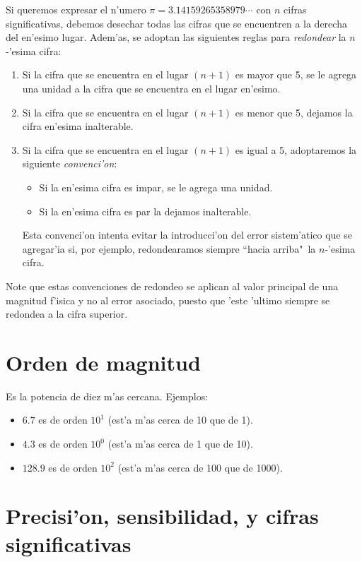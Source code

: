 \documentclass[a4paper]{report}
\begin{document}
Si queremos expresar el n'umero $\pi=3.14159265358979\cdots$ con $n$
cifras significativas, debemos desechar todas las cifras que se
encuentren a la derecha del en'esimo lugar. Adem'as, se adoptan las siguientes reglas para \emph{redondear} la $n$-'esima cifra:
\begin{enumerate}
\item Si la cifra que se encuentra en el lugar $(n + 1)$ es mayor que 5, se
  le agrega una unidad a la cifra que se encuentra en el lugar en'esimo.
\item Si la cifra que se encuentra en el lugar $(n + 1)$ es menor que 5,
  dejamos la cifra en'esima inalterable.
\item Si la cifra que se encuentra en el lugar $(n + 1)$ es igual a 5,
  adoptaremos la siguiente \textit{convenci'on}:
	\begin{itemize}
	\item Si la en'esima cifra es impar, se le agrega una unidad.
	\item Si la en'esima cifra es par la dejamos inalterable.
	\end{itemize}
Esta convenci'on intenta evitar la introducci'on del error sistem'atico que se agregar'ia si, por ejemplo, redondearamos siempre ``hacia arriba"\, la $n$-'esima cifra.
\end{enumerate}

Note que estas convenciones de redondeo se aplican al valor principal de una magnitud f'isica y no al error asociado, puesto que 'este 'ultimo siempre se redondea a la cifra superior.

\section{Orden de magnitud}
Es la potencia de diez m'as cercana. 
Ejemplos:
\begin{itemize}
\item $6.7$ es de orden $10^1$ (est'a m'as cerca de 10 que de 1).
\item $4.3$ es de orden $10^0$ (est'a m'as cerca de 1 que de 10).
\item $128.9$ es de orden $10^2$ (est'a m'as cerca de 100 que de 1000).
\end{itemize}






\section{Precisi'on, sensibilidad, y cifras significativas}
\end{document}
